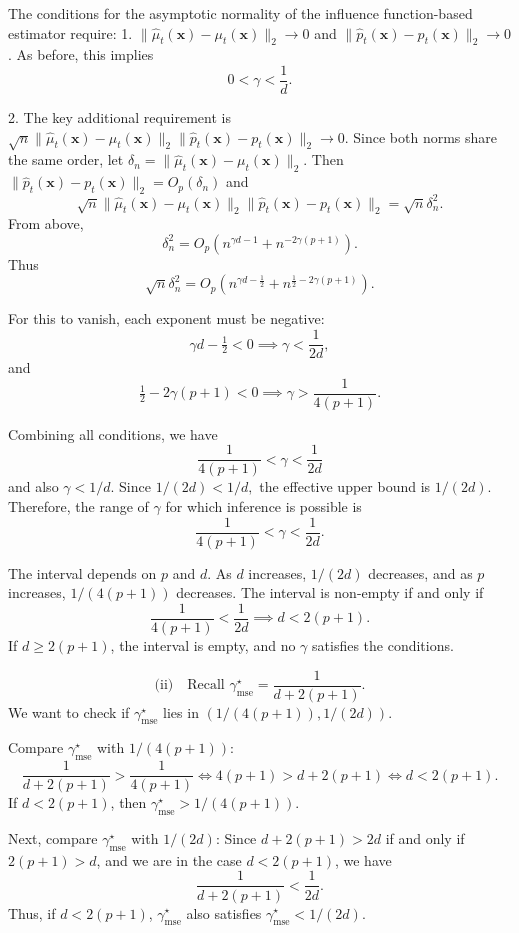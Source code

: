 \documentclass{article}
\begin{document}
The conditions for the asymptotic normality of the influence function-based estimator require:
1. \(\|\hat{\mu}_t(\mathbf{x}) - \mu_t(\mathbf{x})\|_2 \to 0\) and \(\|\hat{p}_t(\mathbf{x}) - p_t(\mathbf{x})\|_2 \to 0\). As before, this implies
\[
0 < \gamma < \frac{1}{d}.
\]

2. The key additional requirement is \(\sqrt{n}\|\hat{\mu}_t(\mathbf{x}) - \mu_t(\mathbf{x})\|_2 \|\hat{p}_t(\mathbf{x}) - p_t(\mathbf{x})\|_2 \to 0.\) Since both norms share the same order, let \(\delta_n = \|\hat{\mu}_t(\mathbf{x}) - \mu_t(\mathbf{x})\|_2\). Then \(\|\hat{p}_t(\mathbf{x}) - p_t(\mathbf{x})\|_2 = O_p(\delta_n)\) and
\[
\sqrt{n}\|\hat{\mu}_t(\mathbf{x}) - \mu_t(\mathbf{x})\|_2 \|\hat{p}_t(\mathbf{x}) - p_t(\mathbf{x})\|_2 = \sqrt{n}\delta_n^2.
\]
From above,
\[
\delta_n^2 = O_p(n^{\gamma d - 1} + n^{-2\gamma(p+1)}).
\]
Thus
\[
\sqrt{n}\delta_n^2 = O_p(n^{\gamma d - \tfrac{1}{2}} + n^{\tfrac{1}{2} - 2\gamma(p+1)}).
\]

For this to vanish, each exponent must be negative:
\[
\gamma d - \tfrac{1}{2} < 0 \implies \gamma < \frac{1}{2d},
\]
and
\[
\tfrac{1}{2} - 2\gamma(p+1) < 0 \implies \gamma > \frac{1}{4(p+1)}.
\]

Combining all conditions, we have
\[
\frac{1}{4(p+1)} < \gamma < \frac{1}{2d}
\]
and also \(\gamma < 1/d\). Since \(1/(2d) < 1/d,\) the effective upper bound is \(1/(2d).\) Therefore, the range of \(\gamma\) for which inference is possible is
\[
\frac{1}{4(p+1)} < \gamma < \frac{1}{2d}.
\]

The interval depends on \(p\) and \(d\). As \(d\) increases, \(1/(2d)\) decreases, and as \(p\) increases, \(1/(4(p+1))\) decreases. The interval is non-empty if and only if
\[
\frac{1}{4(p+1)} < \frac{1}{2d} \implies d < 2(p+1).
\]
If \(d \ge 2(p+1)\), the interval is empty, and no \(\gamma\) satisfies the conditions.

\[
\text{(ii)} \quad \text{Recall } \gamma^\star_{\text{mse}} = \frac{1}{d+2(p+1)}.
\]
We want to check if \(\gamma^\star_{\text{mse}}\) lies in \((1/(4(p+1)), 1/(2d))\).

Compare \(\gamma^\star_{\text{mse}}\) with \(1/(4(p+1))\):
\[
\frac{1}{d+2(p+1)} > \frac{1}{4(p+1)} \iff 4(p+1) > d+2(p+1) \iff d<2(p+1).
\]
If \(d<2(p+1)\), then \(\gamma^\star_{\text{mse}} > 1/(4(p+1))\).

Next, compare \(\gamma^\star_{\text{mse}}\) with \(1/(2d)\):
Since \(d+2(p+1) > 2d\) if and only if \(2(p+1) > d\), and we are in the case \(d<2(p+1)\), we have
\[
\frac{1}{d+2(p+1)} < \frac{1}{2d}.
\]
Thus, if \(d<2(p+1)\), \(\gamma^\star_{\text{mse}}\) also satisfies \(\gamma^\star_{\text{mse}} < 1/(2d)\).
\end{document}
